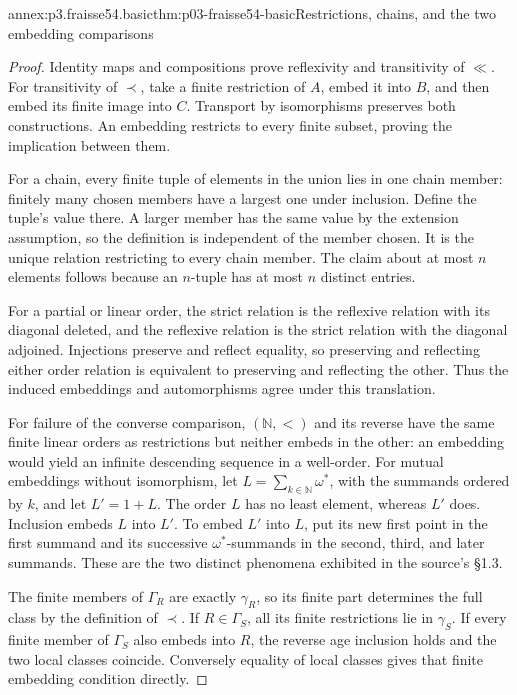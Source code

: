 
\begin{annexitem}{annex:p3.fraisse54.basic}{thm:p03-fraisse54-basic}{Restrictions, chains, and the two embedding comparisons}
\begin{proof}
Identity maps and compositions prove reflexivity and transitivity of
\(\ll\). For transitivity of \(\prec\), take a finite restriction of
\(A\), embed it into \(B\), and then embed its finite image into \(C\).
Transport by isomorphisms preserves both constructions. An embedding
restricts to every finite subset, proving the implication between them.

For a chain, every finite tuple of elements in the union lies in one chain
member: finitely many chosen members have a largest one under inclusion.
Define the tuple's value there. A larger member has the same value by the
extension assumption, so the definition is independent of the member chosen.
It is the unique relation restricting to every chain member. The claim about
at most \(n\) elements follows because an \(n\)-tuple has at most \(n\)
distinct entries.

For a partial or linear order, the strict relation is the reflexive relation
with its diagonal deleted, and the reflexive relation is the strict relation
with the diagonal adjoined. Injections preserve and reflect equality, so
preserving and reflecting either order relation is equivalent to preserving
and reflecting the other. Thus the induced embeddings and automorphisms
agree under this translation.

For failure of the converse comparison, \((\mathbb N,<)\) and its reverse
have the same finite linear orders as restrictions but neither embeds in the
other: an embedding would yield an infinite descending sequence in a
well-order. For mutual embeddings without isomorphism, let
\(L=\sum_{k\in\mathbb N}\omega^*\), with the summands ordered by \(k\),
and let \(L'=1+L\). The order \(L\) has no least element, whereas \(L'\)
does. Inclusion embeds \(L\) into \(L'\). To embed \(L'\) into \(L\),
put its new first point in the first summand and its successive
\(\omega^*\)-summands in the second, third, and later summands. These are
the two distinct phenomena exhibited in the source's \S1.3.

The finite members of \(\Gamma_R\) are exactly \(\gamma_R\), so its
finite part determines the full class by the definition of \(\prec\).
If \(R\in\Gamma_S\), all its finite restrictions lie in \(\gamma_S\).
If every finite member of \(\Gamma_S\) also embeds into \(R\), the
reverse age inclusion holds and the two local classes coincide. Conversely
equality of local classes gives that finite embedding condition directly.
\end{proof}
\end{annexitem}

